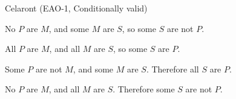 \begin{exercises}
{Celaront (EAO-1, Conditionally valid)
\vspace{6pt} }

\item No $P$ are $M$, and some $M$ are $S$, so some $S$ are not $P$.

\item All $P$ are $M$, and all $M$ are $S$, so some $S$ are $P$.

\item Some $P$ are not $M$, and some $M$ are $S$. Therefore all $S$ are $P$.

\item No $P$ are $M$, and all $M$ are $S$. Therefore some $S$ are not $P$.


\end{exercises}

